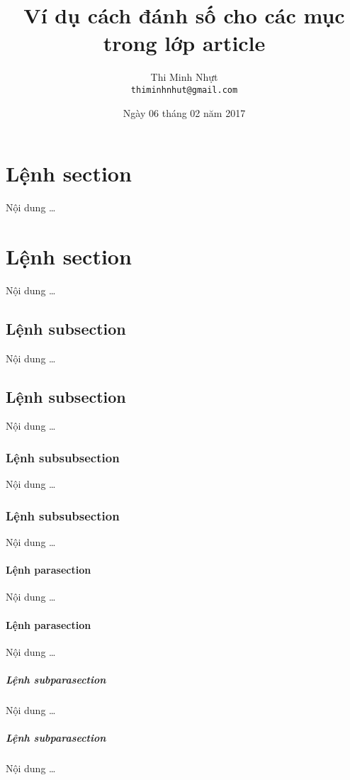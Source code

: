 \documentclass[12pt,a4paper]{article}
\title{\bfseries \huge Ví dụ cách đánh số cho các mục trong lớp article}
\author{\Large Thi Minh Nhựt \bigskip \\  \Large \texttt{thiminhnhut@gmail.com}}
\date{\Large Ngày 06 tháng 02 năm 2017}
\newcommand{\parasection}[1]{\paragraph{#1}\mbox{}\medskip\par}
\newcommand{\subparasection}[1]{{\setlength{\parindent}{0pt}\subparagraph{#1}\mbox{}\medskip \par}}
\begin{document}
\maketitle
\tableofcontents
\thispagestyle{empty}
\newpage

\section{Lệnh section}
Nội dung \ldots
\section{Lệnh section}
Nội dung \ldots

\subsection{Lệnh subsection}
Nội dung \ldots
\subsection{Lệnh subsection}
Nội dung \ldots

\subsubsection{Lệnh subsubsection}
Nội dung \ldots
\subsubsection{Lệnh subsubsection}
Nội dung \ldots

\parasection{Lệnh parasection}
Nội dung \ldots
\parasection{Lệnh parasection}
Nội dung \ldots

\subparasection{Lệnh subparasection}
Nội dung \ldots
\subparasection{Lệnh subparasection}
Nội dung \ldots
\end{document}
